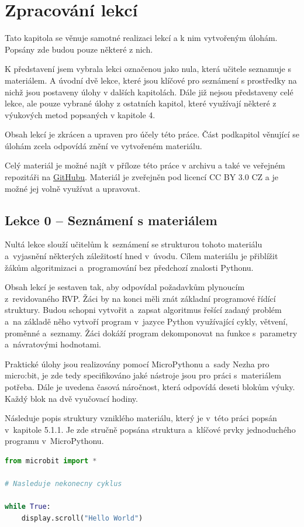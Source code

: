 \documentclass[
  digital,     %
  oneside,     %
  nosansbold,  %
  colorbold, %
  lof,         %
  nolot,         %
]{fithesis4}
\begin{document}
\section{Zpracování lekcí}

Tato kapitola se věnuje samotné realizaci lekcí a k nim vytvořeným úlohám. Popsány zde budou pouze některé z nich. 

K představení jsem vybrala lekci označenou jako nula, která učitele seznamuje s materiálem. A úvodní dvě lekce, které jsou klíčové pro seznámení s prostředky na nichž jsou postaveny úlohy v dalších kapitolách. Dále již nejsou představeny celé lekce, ale pouze vybrané úlohy z ostatních kapitol, které využívají některé z výukových metod popsaných v kapitole 4. %

Obsah lekcí je zkrácen a upraven pro účely této práce. Část podkapitol věnující se úlohám zcela odpovídá znění ve vytvořeném materiálu. %

Celý materiál je možné najít v příloze této práce v archivu %
a také ve veřejném repozitáři na \href{https://github.com/denisa-mat/BP-microbit}{GitHubu}. Materiál je zveřejněn pod licencí CC BY 3.0 CZ a je možné jej volně využívat a upravovat.

\subsection{Lekce 0 -- Seznámení s materiálem}
Nultá lekce slouží učitelům k~seznámení se strukturou tohoto materiálu a~vyjasnění některých záležitostí hned v~úvodu. Cílem materiálu je přiblížit žákům algoritmizaci a~programování bez předchozí znalosti Pythonu. 

Obsah lekcí je sestaven tak, aby odpovídal požadavkům plynoucím z~revidovaného RVP. Žáci by na konci měli znát základní programové řídící struktury. Budou schopni vytvořit a~zapsat algoritmus řešící zadaný problém a~na základě něho vytvoří program v~jazyce Python využívající cykly, větvení, proměnné a~seznamy. Žáci dokáží program dekomponovat na funkce s~parametry a~návratovými hodnotami.

Praktické úlohy jsou realizovány pomocí MicroPythonu a~sady Nezha pro micro:bit, je zde tedy specifikováno jaké nástroje jsou pro práci s~materiálem potřeba. Dále je uvedena časová náročnost, která odpovídá deseti blokům výuky. Každý blok na dvě vyučovací hodiny.

Následuje popis struktury vzniklého materiálu, který je v~této práci popsán v~kapitole 5.1.1. Je zde stručně popsána struktura a~klíčové prvky jednoduchého programu v~MicroPythonu. 
\vspace{0,2cm}
\begin{footnotesize}
\begin{lstlisting}[language=Python, caption=Struktura programu v~MicroPythonu]
from microbit import *

# Nasleduje nekonecny cyklus

while True:
    display.scroll("Hello World")
\end{lstlisting}
\end{footnotesize}
\end{document}
